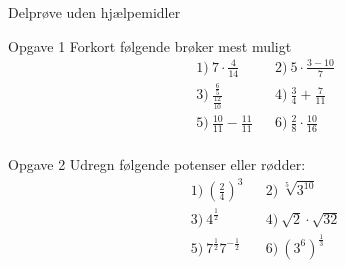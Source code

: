 \documentclass[12pt,x11names,a4paper]{article}
\begin{document}
\newpage


\begin{center}
\LARGE
Delprøve uden hjælpemidler
\end{center}
\begin{opgavetekst}{Opgave 1}
	Forkort følgende brøker mest muligt
	\begin{align*}
		&1) \ 7\cdot \frac{4}{14}  &&2)\ 5\cdot \frac{3-10}{7}   \\
		&3) \ \frac{\frac{6}{5}}{\frac{12}{10}}  &&4)\ \frac{3}{4}+\frac{7}{11}   \\
		&5) \ \frac{10}{11}-\frac{11}{11}  &&6)\ \frac{2}{8}\cdot \frac{10}{16}   \\
	\end{align*}
\end{opgavetekst}
\begin{opgavetekst}{Opgave 2}
	Udregn følgende potenser eller rødder:
	\begin{align*}
		&1) \ \left(\frac{2}{4}\right)^3  &&2) \  \sqrt[5]{3^{10}}  \\
		&3) \ 4^{\frac{1}{2}}  &&4) \ \sqrt{2}\cdot \sqrt{32}   \\
		&5) \ 7^{\frac{1}{2}}7^{-\frac{1}{2}}  &&6) \ \left(3^{6}\right)^\frac{1}{3}   \\
	\end{align*}
\end{opgavetekst}
\end{document}
